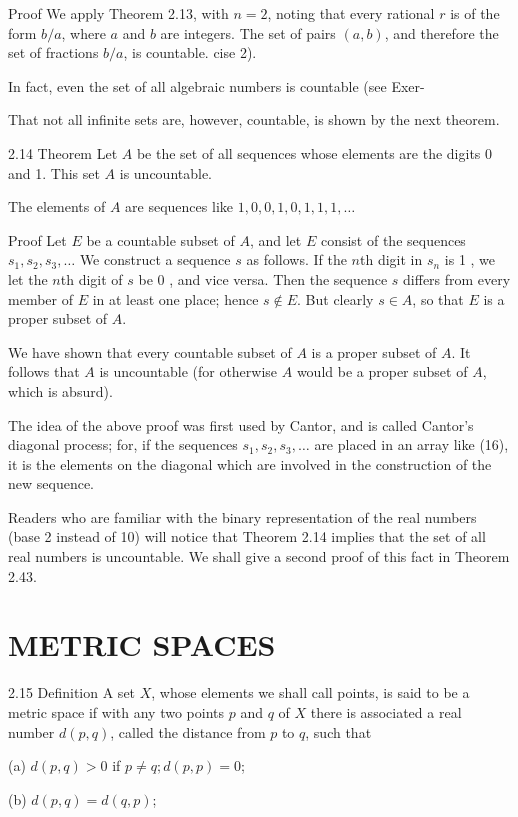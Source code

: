 \documentclass[10pt]{article}
\begin{document}
Proof We apply Theorem 2.13, with $n=2$, noting that every rational $r$ is of the form $b / a$, where $a$ and $b$ are integers. The set of pairs $(a, b)$, and therefore the set of fractions $b / a$, is countable. cise 2).

In fact, even the set of all algebraic numbers is countable (see Exer-

That not all infinite sets are, however, countable, is shown by the next theorem.

2.14 Theorem Let $A$ be the set of all sequences whose elements are the digits 0 and 1. This set $A$ is uncountable.

The elements of $A$ are sequences like $1,0,0,1,0,1,1,1, \ldots$

Proof Let $E$ be a countable subset of $A$, and let $E$ consist of the sequences $s_{1}, s_{2}, s_{3}, \ldots$ We construct a sequence $s$ as follows. If the $n$th digit in $s_{n}$ is 1 , we let the $n$th digit of $s$ be 0 , and vice versa. Then the sequence $s$ differs from every member of $E$ in at least one place; hence $s \notin E$. But clearly $s \in A$, so that $E$ is a proper subset of $A$.

We have shown that every countable subset of $A$ is a proper subset of $A$. It follows that $A$ is uncountable (for otherwise $A$ would be a proper subset of $A$, which is absurd).

The idea of the above proof was first used by Cantor, and is called Cantor's diagonal process; for, if the sequences $s_{1}, s_{2}, s_{3}, \ldots$ are placed in an array like (16), it is the elements on the diagonal which are involved in the construction of the new sequence.

Readers who are familiar with the binary representation of the real numbers (base 2 instead of 10) will notice that Theorem 2.14 implies that the set of all real numbers is uncountable. We shall give a second proof of this fact in Theorem 2.43.

\section{METRIC SPACES}
2.15 Definition A set $X$, whose elements we shall call points, is said to be a metric space if with any two points $p$ and $q$ of $X$ there is associated a real number $d(p, q)$, called the distance from $p$ to $q$, such that

(a) $d(p, q)>0$ if $p \neq q ; d(p, p)=0$;

(b) $d(p, q)=d(q, p)$;
\end{document}
